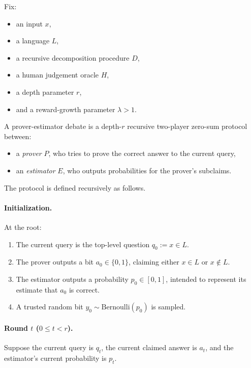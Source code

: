 \documentclass[11pt]{article}
\begin{document}
\begin{definition}
Fix:
\begin{itemize}
    \item an input \(x\),
    \item a language \(L\),
    \item a recursive decomposition procedure \(D\),
    \item a human judgement oracle \(H\),
    \item a depth parameter \(r\),
    \item and a reward-growth parameter \(\lambda > 1\).
\end{itemize}

A prover-estimator debate is a depth-\(r\) recursive two-player zero-sum protocol between:

\begin{itemize}
    \item a \emph{prover} \(P\), who tries to prove the correct answer to the current query,
    \item an \emph{estimator} \(E\), who outputs probabilities for the prover's subclaims.
\end{itemize}

The protocol is defined recursively as follows.

\paragraph{Initialization.}
At the root:
\begin{enumerate}
    \item The current query is the top-level question \(q_0 := x \in L\).
    \item The prover outputs a bit \(a_0 \in \{0,1\}\), claiming either \(x \in L\) or \(x \notin L\).
    \item The estimator outputs a probability \(p_0 \in [0,1]\), intended to represent its estimate that \(a_0\) is correct.
    \item A trusted random bit \(y_0 \sim \mathrm{Bernoulli}(p_0)\) is sampled.
\end{enumerate}

\paragraph{Round \(t\) (\(0 \le t < r\)).}
Suppose the current query is \(q_t\), the current claimed answer is \(a_t\), and the estimator's current probability is \(p_t\).


\end{definition}
\end{document}
